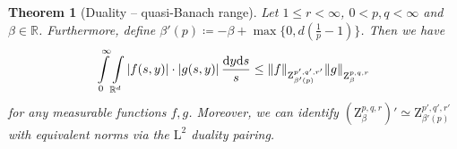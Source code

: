 \documentclass[11pt, leqno,parskip=half]{amsart}
\newtheorem{theorem}{Theorem}[section]
\theoremstyle{definition}
\newcommand{\IR}{\mathbb{R}}
\renewcommand{\L}{\mathrm{L}}
\newcommand{\Z}{\mathrm{Z}}
\renewcommand{\d}{\mathrm{d}}
\numberwithin{equation}{section}
\begin{document}
\begin{theorem}[Duality -- quasi-Banach range]
\label{thm: duality full range}
    Let $1\leq r <\infty$, $0<p,q<\infty$ and $\beta\in \IR$. Furthermore, define $\beta'(p)\coloneqq -\beta+\max\{0,d(\frac{1}{p}-1)\}$.
    Then we have
    \begin{align*}
        \int\limits_0^\infty \int\limits_{\IR^d} |f(s,y)| \cdot |g(s,y)| \,\frac{\d y \d s}{s} \leq  \|f\|_{\Z^{p',q',r'}_{\beta'(p)} }\|g\|_{\Z^{\vphantom{p',q',r'}p,q,r}_{\beta} }
    \end{align*}
    for any measurable functions $f,g$. Moreover, we can identify $(\Z^{p,q,r}_\beta)' \simeq \Z^{p',q',r'}_{\beta'(p)}$ with equivalent norms via the $\L^2$ duality pairing.

\end{theorem}
\end{document}
